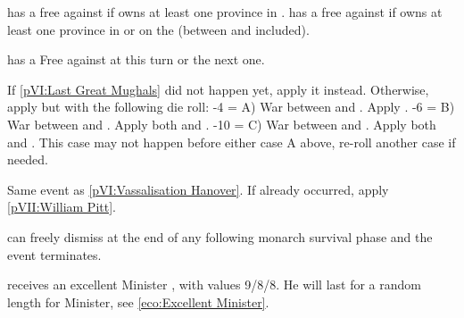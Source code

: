 

\phevnt
\aparag \SUE has a free \CB against \RUS if \RUS owns at least one province in
\regionFinlande.
\aparag \RUS has a free \CB against \SUE if \SUE owns at least one province in
\regionFinlande or on the \regionBaltique (between \provinceNeva and
\provinceCourlande included).





\phevnt
\aparag \AUT has a Free \CB against \TUR at this turn or the next one.




\condition{}
\aparag If \ref{pVI:Last Great Mughals} did not happen yet, apply it instead.
\aparag Otherwise, apply  but with the following die
roll:
-4 = A) War between \paysmogol and \paysperse. Apply
.
-6 = B) War between \paysafghans and \paysperse. Apply both
 and .
-10 = C) War between \paysafghans and \paysmogol. Apply both
 and . This
case may not happen before either case A above, re-roll another case if
needed.




\phevnt
\aparag Same event as \ref{pVI:Vassalisation Hanover}.
\aparag If already occurred, apply \ref{pVII:William Pitt}.





\aparag \ANG can freely dismiss \ministrePitt at the end of any following
monarch survival phase and the event terminates.

\phevnt
\aparag \ANG receives an excellent Minister \ministrePitt, with values 9/8/8.
He will last for a random length for Minister, see \ref{eco:Excellent
  Minister}.

